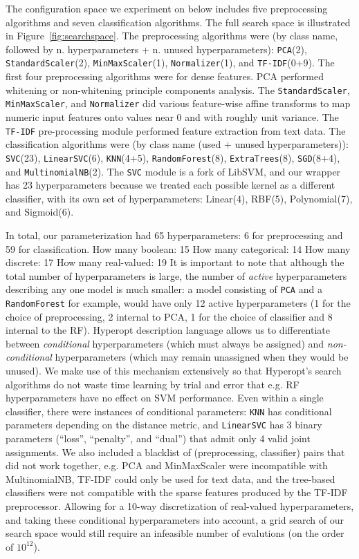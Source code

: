 \documentclass[wcp]{jmlr}
\begin{document}
The configuration space we experiment on below includes five preprocessing algorithms and seven classification algorithms.
The full search space is illustrated in Figure~\ref{fig:searchspace}.
The preprocessing algorithms were (by class name, followed by n. hyperparameters + n. unused hyperparameters): \texttt{PCA}(2), \texttt{StandardScaler}(2), \texttt{MinMaxScaler}(1), \texttt{Normalizer}(1), and \texttt{TF-IDF}(0+9).
The first four preprocessing algorithms were for dense features.
PCA performed whitening or non-whitening principle components analysis.
The \texttt{StandardScaler}, \texttt{MinMaxScaler}, and \texttt{Normalizer} did various feature-wise affine transforms to map numeric input features onto values near 0 and with roughly unit variance.
The \texttt{TF-IDF} pre-processing module performed feature extraction from text data.
The classification algorithms were (by class name (used + unused hyperparameters)): \texttt{SVC}(23), \texttt{LinearSVC}(6), \texttt{KNN}(4+5), \texttt{RandomForest}(8), \texttt{ExtraTrees}(8), \texttt{SGD}(8+4), and \texttt{MultinomialNB}(2).
The \texttt{SVC} module is a fork of LibSVM, and our wrapper has 23 hyperparameters because we treated each possible kernel as a different classifier, with its own set of hyperparameters: Linear(4), RBF(5), Polynomial(7), and Sigmoid(6).

In total, our parameterization had 65 hyperparameters: 6 for preprocessing and 59 for classification.
How many boolean: 15
How many categorical: 14
How many discrete: 17
How many real-valued: 19
It is important to note that although the total number of hyperparameters is large, the number of {\em active} hyperparameters describing any one model is much smaller: a model consisting of \texttt{PCA} and a \texttt{RandomForest} for example,
would have only 12 active hyperparameters (1 for the choice of preprocessing, 2 internal to PCA, 1 for the choice of classifier and 8 internal to the RF).
Hyperopt description language allows us to differentiate between {\em conditional} hyperparameters (which must always be assigned) and {\em non-conditional} hyperparameters (which may remain unassigned when they would be unused).
We make use of this mechanism extensively so that Hyperopt's search algorithms do not waste time learning by trial and error that e.g. RF hyperparameters have no effect on SVM performance.
Even within a single classifier, there were instances of conditional parameters: \texttt{KNN} has conditional parameters depending on the distance metric,
and \texttt{LinearSVC} has 3 binary parameters (``loss'', ``penalty'', and ``dual'') that admit only 4 valid joint assignments.
We also included a blacklist of (preprocessing, classifier) pairs that did not work together, e.g. PCA and MinMaxScaler were incompatible with MultinomialNB, TF-IDF could only be used for text data, and the tree-based classifiers were not
compatible with the sparse features produced by the TF-IDF preprocessor.
Allowing for a 10-way discretization of real-valued hyperparameters, and taking these conditional hyperparameters into account, a grid search of our search space would still require an infeasible number of evalutions (on the order of $10^{12}$).
\end{document}
